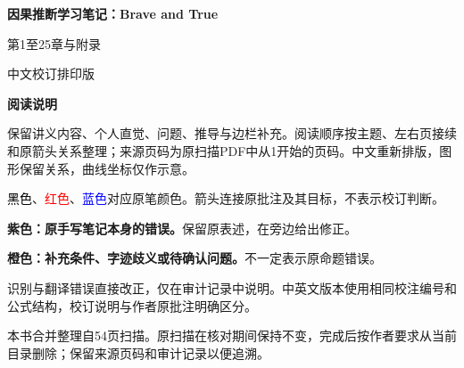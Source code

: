 \documentclass[11pt,a4paper]{article}
\newcommand{\sourcepages}[1]{\par{\small\sffamily\color{muted}\textbf{Scan reference:} #1\par}\nobreak\smallskip\nopagebreak[4]}
\newcommand{\inkblue}[1]{\textcolor{blue}{#1}}
\newcommand{\inkred}[1]{\textcolor{red}{#1}}
\begin{document}
\def\ChineseEdition{1}
\renewcommand{\contentsname}{目录}

\renewcommand{\sourcepages}[1]{\par{\small\sffamily\color{muted}\textbf{原扫描页码：} #1\par}\nobreak\smallskip\nopagebreak[4]}
\begin{titlepage}\thispagestyle{empty}
\vspace*{14mm}{\small\sffamily MING的个人学习笔记\par}\vspace{10mm}
{\Huge\sffamily\bfseries 因果推断学习笔记：Brave and True\par}\vspace{8mm}
{\LARGE\sffamily 第1至25章与附录\par}\vspace{10mm}
{\large 中文校订排印版\par}\vfill
\textbf{阅读说明}\par
保留讲义内容、个人直觉、问题、推导与边栏补充。阅读顺序按主题、左右页接续和原箭头关系整理；来源页码为原扫描PDF中从1开始的页码。中文重新排版，图形保留关系，曲线坐标仅作示意。\par
\textcolor{black}{黑色}、\inkred{红色}、\inkblue{蓝色}对应原笔颜色。箭头连接原批注及其目标，不表示校订判断。\par
\textcolor{ReviewPurple}{\textbf{紫色：原手写笔记本身的错误。}}保留原表述，在旁边给出修正。\par
\textcolor{ReviewOrange}{\textbf{橙色：补充条件、字迹歧义或待确认问题。}}不一定表示原命题错误。\par
识别与翻译错误直接改正，仅在审计记录中说明。中英文版本使用相同校注编号和公式结构，校订说明与作者原批注明确区分。\par
本书合并整理自54页扫描。原扫描在核对期间保持不变，完成后按作者要求从当前目录删除；保留来源页码和审计记录以便追溯。\par
\vspace{6mm}{\small 整理于2026年10月31日\par}
\end{titlepage}\tableofcontents\clearpage
\end{document}
